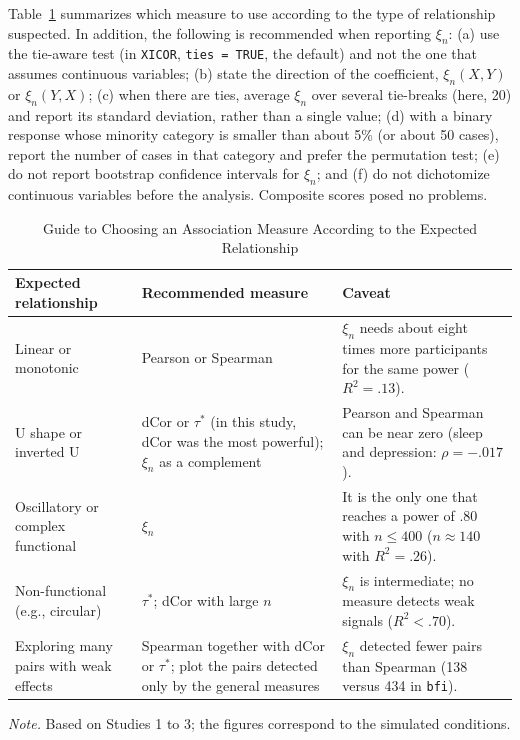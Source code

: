 \documentclass[man,mask,donotrepeattitle,floatsintext]{apa7}
\begin{document}
Table~\ref{tab:guia} summarizes which measure to use according to the type of relationship suspected. In addition, the following is recommended when reporting $\xi_n$: (a) use the tie-aware test (in \texttt{XICOR}, \texttt{ties = TRUE}, the default) and not the one that assumes continuous variables; (b) state the direction of the coefficient, $\xi_n(X,Y)$ or $\xi_n(Y,X)$; (c) when there are ties, average $\xi_n$ over several tie-breaks (here, 20) and report its standard deviation, rather than a single value; (d) with a binary response whose minority category is smaller than about 5\% (or about 50 cases), report the number of cases in that category and prefer the permutation test; (e) do not report bootstrap confidence intervals for $\xi_n$; and (f) do not dichotomize continuous variables before the analysis. Composite scores posed no problems.

\begin{table}
\caption{Guide to Choosing an Association Measure According to the Expected Relationship}
\label{tab:guia}
\begin{threeparttable}
\small
\begin{tabular}{p{3.6cm}p{4.2cm}p{6.6cm}}
\toprule
Expected relationship & Recommended measure & Caveat \\
\midrule
Linear or monotonic & Pearson or Spearman & $\xi_n$ needs about eight times more participants for the same power ($R^2=.13$). \\
U shape or inverted U & dCor or $\tau^*$ (in this study, dCor was the most powerful); $\xi_n$ as a complement & Pearson and Spearman can be near zero (sleep and depression: $\rho=-.017$). \\
Oscillatory or complex functional & $\xi_n$ & It is the only one that reaches a power of .80 with $n\le 400$ ($n\approx 140$ with $R^2=.26$). \\
Non-functional (e.g., circular) & $\tau^*$; dCor with large $n$ & $\xi_n$ is intermediate; no measure detects weak signals ($R^2<.70$). \\
Exploring many pairs with weak effects & Spearman together with dCor or $\tau^*$; plot the pairs detected only by the general measures & $\xi_n$ detected fewer pairs than Spearman (138 versus 434 in \texttt{bfi}). \\
\bottomrule
\end{tabular}
\begin{tablenotes}[flushleft]
\small
\item \textit{Note.} Based on Studies 1 to 3; the figures correspond to the simulated conditions.
\end{tablenotes}
\end{threeparttable}
\end{table}
\end{document}
